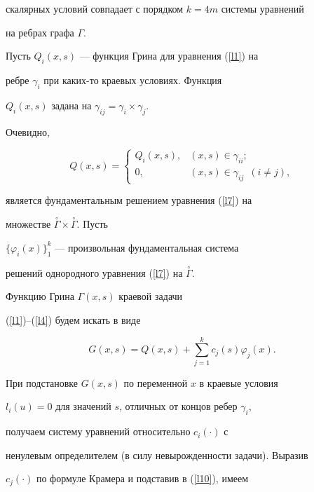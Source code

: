 {{{{{{{скалярных условий совпадает с порядком $k=4m$ системы уравнений


на ребрах графа $\Gamma$.





Пусть $Q_i(x,s)$ --- функция Грина для уравнения (\ref{l1}) на


ребре $\gamma_i $ при каких-то краевых условиях. Функция


$Q_i(x,s)$ задана на $\gamma_{ij}=\gamma_i\times\gamma_j $.


Очевидно,


$$


Q(x,s)=


\begin{cases}


Q_i(x,s), & (x,s)\in \gamma_{ii};\\


0, &(x,s)\in \gamma_{ij}\ \;(i\neq j),


\end{cases}


$$


является фундаментальным решением уравнения (\ref{l7}) на


множестве $\overset{\circ}{\Gamma}{}\times\overset{\circ}{\Gamma}$. Пусть


$\{\varphi_i(x)\}^k_1 $ --- произвольная фундаментальная система


решений однородного уравнения (\ref{l7}) на $\overset{\circ}{\Gamma}$.


Функцию Грина $\Gamma(x,s) $ краевой задачи


(\ref{l1})--(\ref{l4}) будем искать в виде


\begin{equation}


\label{l10}


G(x,s)=Q(x,s)+\sum^k_{j=1}c_j(s)\varphi_j(x).


\end{equation}


При подстановке $G(x,s)$ по переменной $x$ в краевые условия


$l_i(u)=0$ для значений $s$, отличных от концов ребер $\gamma_i$,


получаем систему уравнений относительно $c_i(\cdot) $ с


ненулевым определителем (в силу невырожденности задачи). Выразив


$c_j(\cdot) $ по формуле Крамера и подставив в (\ref{l10}), имеем


}}}}}}}
